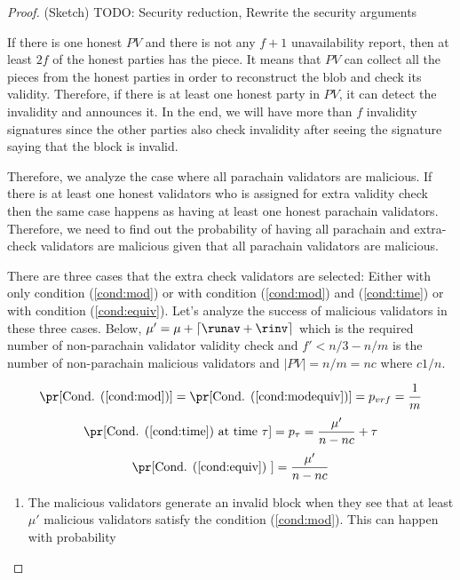 \begin{proof}(Sketch)
TODO: Security reduction, Rewrite the security arguments


If there is one honest $PV$ and there is not any $f+1$ unavailability report, then at least $2f$ of the honest parties has the piece. It means that $PV$ can collect all the pieces from the honest parties in order to reconstruct the blob and check its validity. Therefore, if there is at least one honest party in $PV$, it can detect the invalidity and announces it. In the end, we will have more than $f$ invalidity signatures since the other parties also check invalidity after seeing the signature saying that the block is invalid.

Therefore, we analyze the case where all parachain validators are malicious. 
If there is at least one honest validators who is assigned for extra validity check then the same case happens as having at least one honest parachain validators. Therefore, we need to find out the probability of having all parachain and extra-check validators are malicious given that all parachain validators are malicious. 

There are three cases that the extra check validators are selected: Either with only condition (\ref{cond:mod}) or with condition (\ref{cond:mod}) and (\ref{cond:time}) or with condition (\ref{cond:equiv}). Let's analyze the success of malicious validators in these three cases. Below, $\mu' = \mu+\lceil \runav + \rinv \rceil $ which is the required number of non-parachain validator validity check and $f' < n/3 - n/m$ is the number of non-parachain malicious validators and  $|PV| = n/m = nc$ where $c 1/n$. 

$$\pr[\text{Cond. (\ref{cond:mod})}] =\pr[\text{Cond. (\ref{cond:modequiv})}] = p_{vrf} = \frac{1}{m}$$
$$\pr[\text{Cond. (\ref{cond:time}) at time } \tau] = p_\tau =  \frac{\mu'}{n - nc} + \tau $$
$$\pr[\text{Cond. (\ref{cond:equiv}) }] = \frac{\mu'}{n - nc} $$


\begin{enumerate}


    \item The malicious validators generate an invalid block when they see that at least $\mu'$ malicious validators satisfy the condition (\ref{cond:mod}). This can happen with probability
    

\end{enumerate}
\end{proof}
